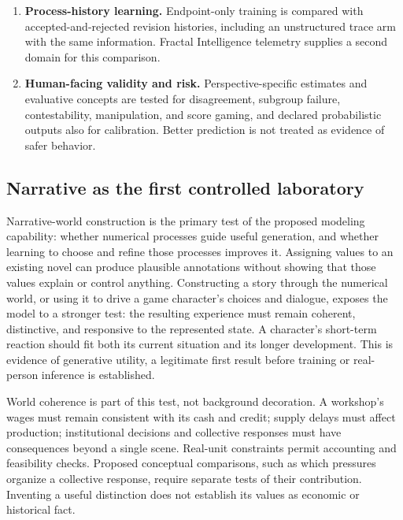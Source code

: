 \documentclass[10pt]{article}
\begin{document}
\begin{enumerate}
    consented longitudinal data are frozen at their historical cutoff and
    scored only against later evidence, following Temporal Hindsight Learning
    discipline~\cite{westerbergTHL2026}.
  \item \textbf{Process-history learning.} Endpoint-only training is compared
    with accepted-and-rejected revision histories, including an unstructured
    trace arm with the same information. Fractal Intelligence telemetry supplies
    a second domain for this comparison.
  \item \textbf{Human-facing validity and risk.} Perspective-specific estimates and
    evaluative concepts are tested for disagreement, subgroup failure,
    contestability, manipulation, and score gaming, and declared probabilistic
    outputs also for calibration. Better prediction
    is not treated as evidence of safer behavior.
\end{enumerate}

\subsection{Narrative as the first controlled laboratory}
\label{sec:narrative-laboratory}

Narrative-world construction is the primary test of the proposed modeling
capability: whether numerical processes guide useful generation, and whether
learning to choose and refine those processes improves it.
Assigning values to an existing novel can produce plausible annotations
without showing that those values explain or control anything. Constructing a
story through the numerical world, or using it to drive a game character's
choices and dialogue, exposes the model to a stronger test: the resulting
experience must remain coherent, distinctive, and responsive to the represented
state. A character's short-term reaction should fit both its current situation
and its longer development. This is evidence of generative utility, a legitimate
first result before training or real-person inference is established.

World coherence is part of this test, not background decoration. A workshop's
wages must remain consistent with its cash and credit; supply delays must
affect production; institutional decisions and collective responses must have
consequences beyond a single scene. Real-unit constraints permit accounting
and feasibility checks. Proposed conceptual comparisons, such as which
pressures organize a collective response, require separate tests of their
contribution. Inventing a useful distinction does not establish its values as
economic or historical fact.
\end{document}
